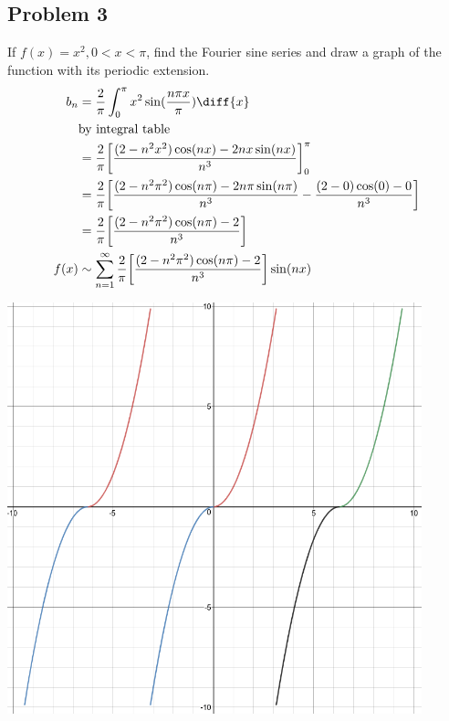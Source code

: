 \documentclass{math}
\begin{document}
\subsection*{Problem 3}
If \( f(x) = x^2, 0<x<\pi \), find the Fourier sine series and draw a graph
of the function with its periodic extension.
\begin{align*}
  b_n &= \frac{2}{\pi}\int_{0}^{\pi}x^2\sin(\frac{n\pi x}{\pi})\diff{x} \\
  & \text{by integral table} \\
  &= \frac{2}{\pi}\bigg[
    \frac{(2-n^2x^2)\cos(nx)-2nx\sin(nx)}{n^3}\bigg]_{0}^{\pi} \\
  &= \frac{2}{\pi}\bigg[
    \frac{(2-n^2\pi^2)\cos(n\pi)-2n\pi\sin(n\pi)}{n^3}-
    \frac{(2-0)\cos(0)-0}{n^3}
  \bigg] \\
  &= \frac{2}{\pi}\bigg[\frac{(2-n^2\pi^2)\cos(n\pi)-2}{n^3}\bigg] \\
  f(x) &\sim \sum_{n=1}^{\infty}
    \frac{2}{\pi}\bigg[\frac{(2-n^2\pi^2)\cos(n\pi)-2}{n^3}\bigg]\sin(nx) \\
\end{align*}
\begin{center}
  \includegraphics[width=12cm]{assets/hw_06_graph.png}
\end{center}
\end{document}
